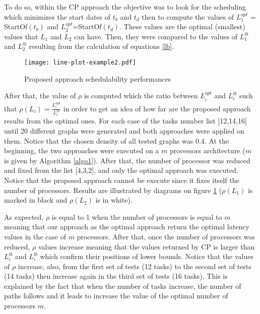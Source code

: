 \documentclass{ijcaArticle}
\begin{document}
To do so, within the CP approach the objective was to look for the scheduling which minimizes the start dates of $t_b$ and $t_d$ then to
compute the values of $L_{1}^{opt}$ = StartOf$(t_b)$ and $L_{2}^{opt}$=StartOf$(t_d)$. These values are the 
optimal (smallest) values that $L_1$ and $L_2$ can have. Then, they were compared to the values of $L_{1}^{lb}$ and $L_{2}^{lb}$ resulting from the calculation of equations \ref{lb}.  


\begin{figure}[h!] 
\begin{center} 
\texttt{[image: line-plot-example2.pdf]} 
\caption{Proposed approach schedulability performances} 
\label{plot} 
\end{center} 
\end{figure}
After that, the value of $\rho$ is computed which the ratio between $L_{i}^{opt}$ and $L_{i}^{lb}$ such that  $\rho (L_i) = \frac{L_{i}^{opt}}{L_{i}^{lb}}$ 
 in order to get an  idea of how far are the proposed approach results from the optimal ones. For each case of the tasks number list [12,14,16] until 20 different graphs were generated and both approaches were applied on them. Notice that the chosen density of all tested graphs was 0.4. At the beginning, the two approaches were executed on a $m$ processors architecture ($m$ is given by Algorithm \ref{algo1}). After that, the number of processor was reduced and fixed from the list [4,3,2], and only the optimal approach was executed. Notice that the proposed approach cannot be execute since it fixes itself  the number of processors. Results are illustrated by diagrams on figure \ref{plot} ($\rho (L_1)$ is marked in black and $\rho (L_2)$ is in white). 
 
As expected, $\rho$ is equal to 1 when the number of processors is equal to $m$ meaning that our approach as the optimal approach return the optimal latency values in the case of $m$ processors. After that, once the number of processors was reduced, $\rho$ values increase meaning that the values returned by CP is larger than $L_{i}^{lb}$ and $L_{i}^{lb}$  which confirm their positions of lower bounds. Notice that the values of $\rho$ increase, also, from the first set of tests (12 tasks) to the second set of tests (14 tasks) then increase again in the third set of tests (16 tasks). This is explained by the fact that when the number of tasks increase, the number of paths follows and it leads to increase the value of the optimal number of processors $m$. 
 
\end{document}
